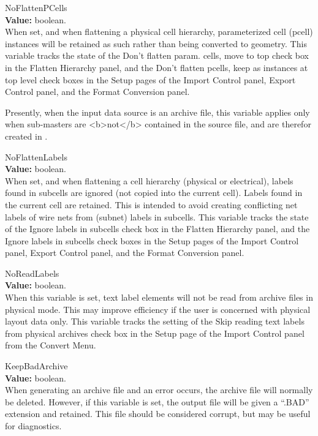 \begin{description}
\item{\et NoFlattenPCells}\\
{\bf Value:} boolean.\\
When set, and when flattening a physical cell hierarchy, parameterized
cell (pcell) instances will be retained as such rather than being
converted to geometry.  This variable tracks the state of the {\cb
Don't flatten param.  cells, move to top} check box in the {\cb
Flatten Hierarchy} panel, and the {\cb Don't flatten pcells, keep as
instances at top level} check boxes in the {\cb Setup} pages of the
{\cb Import Control} panel, {\cb Export Control} panel, and the {\cb
Format Conversion} panel.

Presently, when the input data source is an archive file, this
variable applies only when sub-masters are <b>not</b> contained in the
source file, and are therefor created in {\Xic}.

\item{\et NoFlattenLabels}\\
{\bf Value:} boolean.\\
When set, and when flattening a cell hierarchy (physical or
electrical), labels found in subcells are ignored (not copied into the
current cell).  Labels found in the current cell are retained.  This
is intended to avoid creating conflicting net labels of wire nets from
(subnet) labels in subcells.  This variable tracks the state of the
{\cb Ignore labels in subcells} check box in the {\cb Flatten
Hierarchy} panel, and the {\cb Ignore labels in subcells} check boxes
in the {\cb Setup} pages of the {\cb Import Control} panel, {\cb
Export Control} panel, and the {\cb Format Conversion} panel.

\item{\et NoReadLabels}\\
{\bf Value:} boolean.\\
When this variable is set, text label elements will not be read from
archive files in physical mode.  This may improve efficiency if the
user is concerned with physical layout data only.  This variable
tracks the setting of the {\cb Skip reading text labels from physical
archives} check box in the {\cb Setup} page of the {\cb Import
Control} panel from the {\cb Convert Menu}.

\item{\et KeepBadArchive}\\
{\bf Value:} boolean.\\
When generating an archive file and an error occurs, the archive file
will normally be deleted.  However, if this variable is set, the
output file will be given a ``{\vt .BAD}'' extension and retained. 
This file should be considered corrupt, but may be useful for
diagnostics.
\end{description}


